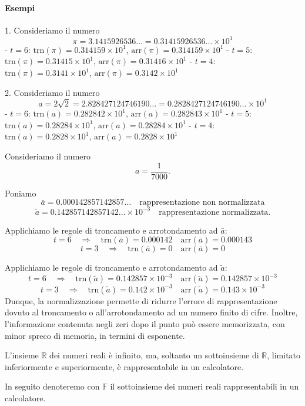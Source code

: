 \documentclass{article}
\theoremstyle{plain}
\theoremstyle{definition}
\theoremstyle{remark}
\begin{document}
\paragraph{Esempi}
1. Consideriamo il numero
\[ \pi = 3.1415926536 \ldots = 0.31415926536 \ldots \times 10^1 \]
   - \(t=6\): \(\text{trn}(\pi) = 0.314159 \times 10^1\), \(\text{arr}(\pi) = 0.314159 \times 10^1\)
   - \(t=5\): \(\text{trn}(\pi) = 0.31415 \times 10^1\), \(\text{arr}(\pi) = 0.31416 \times 10^1\)
   - \(t=4\): \(\text{trn}(\pi) = 0.3141 \times 10^1\), \(\text{arr}(\pi) = 0.3142 \times 10^1\)

2. Consideriamo il numero
\[ a = 2\sqrt{2} = 2.828427124746190 \ldots = 0.2828427124746190 \ldots \times 10^1 \]
   - \(t=6\): \(\text{trn}(a) = 0.282842 \times 10^1\), \(\text{arr}(a) = 0.282843 \times 10^1\)
   - \(t=5\): \(\text{trn}(a) = 0.28284 \times 10^1\), \(\text{arr}(a) = 0.28284 \times 10^1\)
   - \(t=4\): \(\text{trn}(a) = 0.2828 \times 10^1\), \(\text{arr}(a) = 0.2828 \times 10^1\)

Consideriamo il numero
\[
a = \frac{1}{7000}.
\]

Poniamo
\[
\bar{a} = 0.000142857142857\ldots \quad \text{rappresentazione non normalizzata}
\]
\[
\tilde{a} = 0.142857142857142\ldots \times 10^{-3} \quad \text{rappresentazione normalizzata.}
\]

Applichiamo le regole di troncamento e arrotondamento ad $\bar{a}$:
\[
t = 6 \quad \Rightarrow \quad \text{trn}(\bar{a}) = 0.000142 \quad \text{arr}(\bar{a}) = 0.000143
\]
\[
t = 3 \quad \Rightarrow \quad \text{trn}(\bar{a}) = 0 \quad \text{arr}(\bar{a}) = 0
\]

Applichiamo le regole di troncamento e arrotondamento ad $\tilde{a}$:
\[
t = 6 \quad \Rightarrow \quad \text{trn}(\tilde{a}) = 0.142857 \times 10^{-3} \quad \text{arr}(\tilde{a}) = 0.142857 \times 10^{-3}
\]
\[
t = 3 \quad \Rightarrow \quad \text{trn}(\tilde{a}) = 0.142 \times 10^{-3} \quad \text{arr}(\tilde{a}) = 0.143 \times 10^{-3}
\]
Dunque, la normalizzazione permette di ridurre l'errore di rappresentazione dovuto al troncamento o all'arrotondamento ad un numero finito di cifre. 
Inoltre, l'informazione contenuta negli zeri dopo il punto può essere memorizzata, con minor spreco di memoria, in termini di esponente.

L'insieme $\mathbb{R}$ dei numeri reali è infinito, ma, soltanto un sottoinsieme di $\mathbb{R}$, limitato inferiormente e superiormente, è rappresentabile in un calcolatore.

In seguito denoteremo con $\mathbb{F}$ il sottoinsieme dei numeri reali rappresentabili in un calcolatore.
\end{document}
